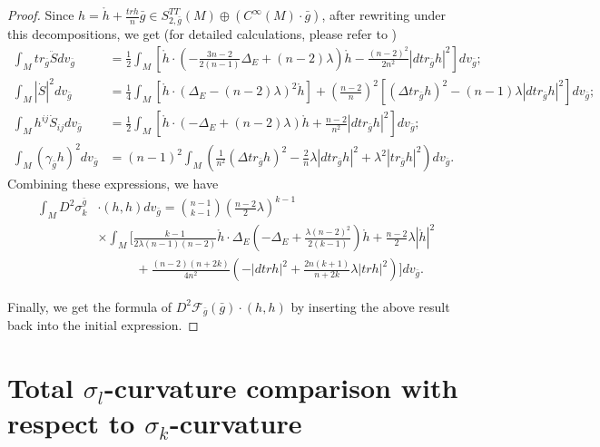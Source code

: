 \documentclass[12pt]{amsart}
\newcommand{\bg}{\bar{g}}
\numberwithin{equation}{section}
\begin{document}
\begin{proof}
   Since $h=\mathring{h}+\frac{trh}{n}\bg\in S^{TT}_{2,\bg}(M)\oplus(C^\infty(M)\cdot\bg)$, after rewriting  under this decompositions, we get (for detailed calculations, please refer to \cite{2025Volume})
    \begin{align*}
        \int_M tr_{\bg} \ddot{S} dv_{\bg} &= \frac{1}{2} \int_M \left[ \mathring{h} \cdot \left(-\frac{3n-2}{2(n-1)}\Delta_E + (n-2)\lambda \right) \mathring{h} - \frac{(n-2)^2}{2n^2} \left| d tr_{\bg} h \right|^2 \right] dv_{\bg};\\
        \int_M \left| \dot{S} \right|^2 dv_{\bg} &= \frac{1}{4} \int_M \left[ \mathring{h} \cdot \left( \Delta_E-(n-2)\lambda \right)^2 \mathring{h} \right]  + \left( \frac{n-2}{n}\right)^2 \left[ \left(\Delta tr_{\bg} h \right)^2 - (n-1) \lambda \left| dtr_{\bg}h \right|^2 \right] dv_{\bg};\\
        \int_M h^{ij} \dot{S}_{ij} dv_{\bg} &= \frac{1}{2} \int_M \left[ \mathring{h} \cdot \left(-\Delta_E+(n-2)\lambda \right) \mathring{h}+\frac{n-2}{n^2} \left| dtr_{\bg}h \right|^2 \right] dv_{\bg};\\
        \int_M (\gamma_{\bg}h)^2 dv_{\bg} &= (n-1)^2 \int_M \left( \frac{1}{n^2} \left(\Delta tr_{\bg}h \right)^2 - \frac{2}{n} \lambda \left| dtr_{\bg}h \right|^2+\lambda^2 \left| tr_{\bg}h \right|^2 \right) dv_{\bg}.
    \end{align*}
   Combining these expressions, we have
   \begin{equation*}
   \begin{split}
       \int_MD^2\sigma_k^{\bg}&\cdot(h,h)dv_{\bg}=\binom{n-1}{k-1}\left(\frac{n-2}{2}\lambda\right)^{k-1}\\
       &\times\int_M\bigg[\frac{k-1}{2\lambda(n-1)(n-2)}\mathring{h}\cdot\Delta_E\left(-\Delta_E+\frac{\lambda(n-2)^2}{2(k-1)}\right)\mathring{h}+\frac{n-2}{2}\lambda|\mathring{h}|^2\\
       &\qquad\quad+\frac{(n-2)(n+2k)}{4n^2}\left(-|dtrh|^2+\frac{2n(k+1)}{n+2k}\lambda|trh|^2\right)\bigg]dv_{\bg}.
   \end{split}
   \end{equation*}

   Finally, we get the formula of $D^2\mathcal{F}_{\bg}({\bg})\cdot(h,h)$ by inserting the above result back into the initial expression.
\end{proof}


\section{Total {$\sigma_l$-curvature} comparison with respect to {$\sigma_k$-curvature}}\label{Section: 4}
\end{document}

